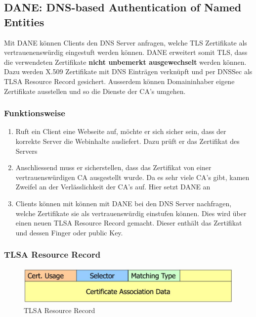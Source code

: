 \clearpage

\subsection{DANE: DNS-based Authentication of Named Entities}
Mit DANE können Clients den DNS Server anfragen, welche TLS Zertifikate als vertrauenenswürdig eingestuft werden können. DANE erweitert somit TLS, dass die verwendeten Zertifikate \textbf{ nicht unbemerkt ausgewechselt} werden können. Dazu werden X.509 Zertifikate mit DNS Einträgen verknüpft und per DNSSec als TLSA Resource Record gesichert. Ausserdem können Domaininhaber eigene Zertifikate ausstellen und so die Dienste der CA's umgehen.

\subsubsection{Funktionsweise}
\begin{enumerate}
	\item Ruft ein Client eine Webseite auf, möchte er sich sicher sein, dass der korrekte Server die Webinhalte ausliefert. Dazu prüft er das Zertifikat des Servers
	\item Anschliessend muss er sicherstellen, dass das Zertifikat von einer vertrauenswürdigen CA ausgestellt wurde. Da es sehr viele CA's gibt, kamen Zweifel an der Verlässlichkeit der CA's auf. Hier setzt DANE an
	\item Clients können mit können mit DANE bei den DNS Server nachfragen, welche Zertifikate sie als vertrauenswürdig einstufen können. Dies wird über einen neuen TLSA Resource Record gemacht. Dieser enthält das Zertifikat und dessen Finger oder public Key. 
\end{enumerate}


\subsubsection{TLSA Resource Record}
\begin{figure}[h]
\centering
\includegraphics[width=0.7\linewidth]{images/tlsa_resource_record}
\caption{TLSA Resource Record}
\label{fig:tlsaresourcerecord}
\end{figure}

